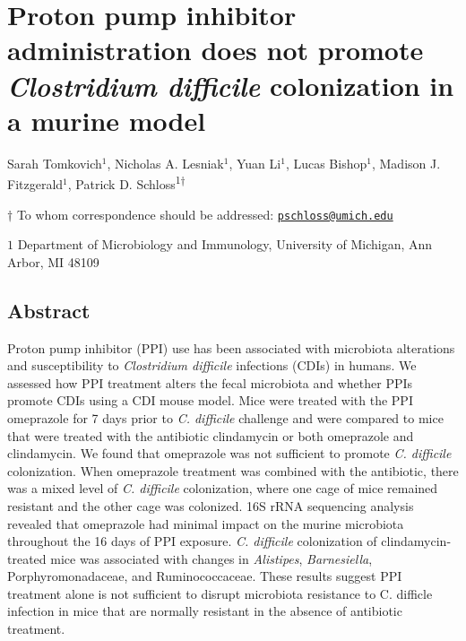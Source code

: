 \documentclass[11pt,]{article}
\title{}
\author{}
\date{}
\begin{document}
\vspace{35mm}

\section{\texorpdfstring{Proton pump inhibitor administration does not
promote \emph{Clostridium difficile} colonization in a murine
model}{Proton pump inhibitor administration does not promote Clostridium difficile colonization in a murine model}}\label{proton-pump-inhibitor-administration-does-not-promote-clostridium-difficile-colonization-in-a-murine-model}

\vspace{35mm}

Sarah Tomkovich\({^1}\), Nicholas A. Lesniak\({^1}\), Yuan Li\({^1}\),
Lucas Bishop\({^1}\), Madison J. Fitzgerald\({^1}\), Patrick D.
Schloss\textsuperscript{1\(\dagger\)}

\vspace{40mm}

\(\dagger\) To whom correspondence should be addressed:
\href{mailto:pschloss@umich.edu}{\nolinkurl{pschloss@umich.edu}}

\(1\) Department of Microbiology and Immunology, University of Michigan,
Ann Arbor, MI 48109

\newpage

\linenumbers

\subsection{Abstract}\label{abstract}

Proton pump inhibitor (PPI) use has been associated with microbiota
alterations and susceptibility to \emph{Clostridium difficile}
infections (CDIs) in humans. We assessed how PPI treatment alters the
fecal microbiota and whether PPIs promote CDIs using a CDI mouse model.
Mice were treated with the PPI omeprazole for 7 days prior to \emph{C.
difficile} challenge and were compared to mice that were treated with
the antibiotic clindamycin or both omeprazole and clindamycin. We found
that omeprazole was not sufficient to promote \emph{C. difficile}
colonization. When omeprazole treatment was combined with the
antibiotic, there was a mixed level of \emph{C. difficile} colonization,
where one cage of mice remained resistant and the other cage was
colonized. 16S rRNA sequencing analysis revealed that omeprazole had
minimal impact on the murine microbiota throughout the 16 days of PPI
exposure. \emph{C. difficile} colonization of clindamycin-treated mice
was associated with changes in \emph{Alistipes}, \emph{Barnesiella},
Porphyromonadaceae, and Ruminococcaceae. These results suggest PPI
treatment alone is not sufficient to disrupt microbiota resistance to C.
difficle infection in mice that are normally resistant in the absence of
antibiotic treatment.
\end{document}
